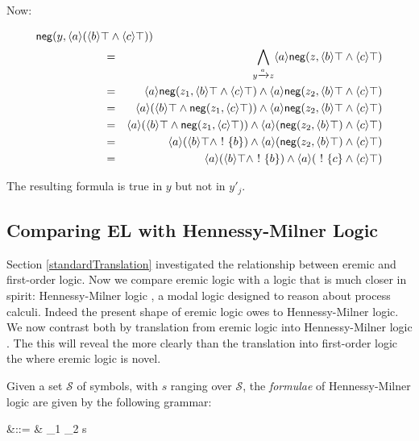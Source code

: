 \NI Now:

\begin{eqnarray*}
\lefteqn{\mathsf{neg}(y, \langle a \rangle (\langle b \rangle \top \AND \langle c \rangle \top))}\qquad \qquad \qquad  \\
& = & \bigwedge\limits_{y \xrightarrow{a} z} \langle a \rangle \mathsf{neg}(z, \langle b \rangle \top \AND \langle c \rangle \top)  \\
& = & \langle a \rangle \mathsf{neg}(z_1, \langle b \rangle \top \AND \langle c \rangle \top) \AND \langle a \rangle\mathsf{neg}(z_2, \langle b \rangle \top \AND \langle c \rangle \top)  \\
& = & \langle a \rangle (\langle b \rangle \top \AND \mathsf{neg}(z_1, \langle c \rangle \top)) \AND \langle a \rangle\mathsf{neg}(z_2, \langle b \rangle \top \AND \langle c \rangle \top)  \\
& = & \langle a \rangle (\langle b \rangle \top \AND \mathsf{neg}(z_1, \langle c \rangle \top)) \AND \langle a \rangle(\mathsf{neg}(z_2, \langle b \rangle \top) \AND \langle c \rangle \top)  \\
& = & \langle a \rangle (\langle b \rangle \top \AND \fBang \{b\}) \AND \langle a \rangle(\mathsf{neg}(z_2, \langle b \rangle \top) \AND \langle c \rangle \top)  \\
& = & \langle a \rangle (\langle b \rangle \top \AND \fBang \{b\}) \AND \langle a \rangle(\fBang \{c\} \AND \langle c \rangle \top) 
\end{eqnarray*}

\NI The resulting formula is true in $y$ but not in $y'_j$.


\subsection{Comparing EL with Hennessy-Milner Logic}

Section \ref{standardTranslation} investigated the relationship
between eremic and first-order logic. Now we compare eremic logic with
a logic that is much closer in spirit: Hennessy-Milner logic
\cite{HennessyM:alglawfndac}, a modal logic designed to reason about
process calculi. Indeed the present shape of eremic logic owes to
Hennessy-Milner logic. We now contrast both by translation from eremic
logic into Hennessy-Milner logic . The
this will reveal the more clearly than the translation into
first-order logic the where eremic logic is novel.

Given a set $\mathcal{S}$ of symbols, with $s$ ranging over
$\mathcal{S}$, the \emph{formulae} of Hennessy-Milner logic are given
by the following grammar:
\begin{GRAMMAR}
  \phi 
     &\quad ::= \quad & 
  \top \fOr \phi_1 \AND \phi_2 \fOr \langle s \rangle \phi \fOr \neg \phi 
\end{GRAMMAR}

